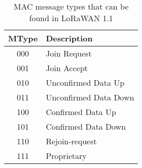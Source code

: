 \begin{table}[H]
    \caption{MAC message types that can be found in LoRaWAN 1.1}
    \label{tab:message_types}
    \centering
    \begin{tabular}{|c|l|}
        \hline
        \textbf{MType} & \textbf{Description}      \\ \hline
        000            & Join Request              \\ \hline
        001            & Join Accept               \\ \hline
        010            & Unconfirmed Data Up       \\ \hline
        011            & Unconfirmed Data Down     \\ \hline
        100            & Confirmed Data Up         \\ \hline
        101            & Confirmed Data Down       \\ \hline
        110            & Rejoin-request            \\ \hline
        111            & Proprietary               \\ \hline
    \end{tabular}
\end{table}